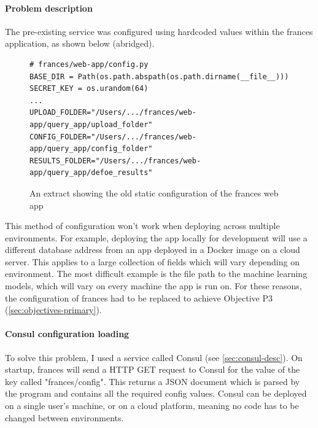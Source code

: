 \documentclass[12pt, letterpaper]{article}
\begin{document}
\paragraph{Problem description}

\begin{flushleft}
The pre-existing service was configured using hardcoded values within the frances application, as shown below (abridged).
\end{flushleft}

\begin{flushleft}
\begin{figure}[H]
\begin{verbatim}
# frances/web-app/config.py
BASE_DIR = Path(os.path.abspath(os.path.dirname(__file__)))
SECRET_KEY = os.urandom(64)
...
UPLOAD_FOLDER="/Users/.../frances/web-app/query_app/upload_folder"
CONFIG_FOLDER="/Users/.../frances/web-app/query_app/config_folder"
RESULTS_FOLDER="/Users/.../frances/web-app/query_app/defoe_results"
\end{verbatim}
\caption{An extract showing the old static configuration of the frances web app}
\end{figure}
\end{flushleft}

\begin{flushleft}
This method of configuration won't work when deploying across multiple environments. For example, deploying the app locally for development will use a different database address from an app deployed in a Docker image on a cloud server. This applies to a large collection of fields which will vary depending on environment. The most difficult example is the file path to the machine learning models, which will vary on every machine the app is run on. For these reasons, the configuration of frances had to be replaced to achieve Objective P3 (\ref{sec:objectives-primary}).
\end{flushleft}

\paragraph{Consul configuration loading}

\begin{flushleft}
To solve this problem, I used a service called Consul (see \ref{sec:consul-desc}). On startup, frances will send a HTTP GET request to Consul for the value of the key called "frances/config". This returns a JSON document which is parsed by the program and contains all the required config values. Consul can be deployed on a single user's machine, or on a cloud platform, meaning no code has to be changed between environments.
\end{flushleft}
\end{document}

